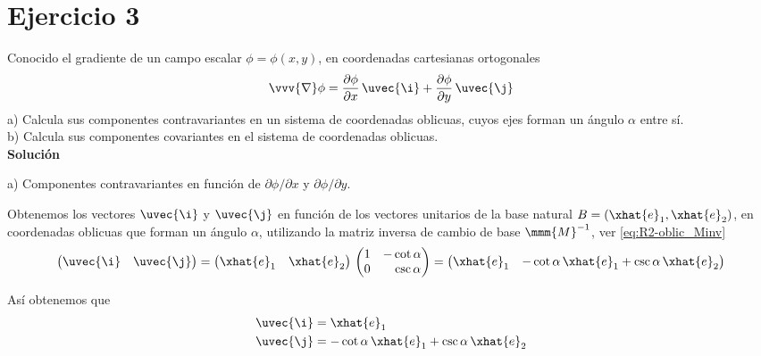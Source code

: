 %

\section{Ejercicio 3}
Conocido el gradiente de un campo escalar $\phi=\phi(x,y)$, en coordenadas cartesianas ortogonales
\[
  \vvv{\nabla}\phi
  = \dfrac{\partial\phi}{\partial x}\,\uvec{\i}
  + \dfrac{\partial\phi}{\partial y}\,\uvec{\j}
\]
\noindent
a) Calcula sus componentes contravariantes en un sistema de coordenadas oblicuas, cuyos
ejes forman un ángulo $\alpha$ entre sí.\\
b) Calcula sus componentes covariantes en el sistema de coordenadas oblicuas.\\

\noindent
\textbf{Solución}

\noindent
a) Componentes contravariantes en función de $\partial\phi/\partial x$ y
$\partial\phi/\partial y$.

Obtenemos los vectores $\uvec{\i}$ y $\uvec{\j}$ en función de los vectores
unitarios de la base natural $B=(\xhat{e}_1, \xhat{e}_2)$, en coordenadas oblicuas que
forman un ángulo $\alpha$, utilizando la matriz inversa de cambio de base
$\mmm{M}^{-1}$, ver \eqref{eq:R2-oblic_Minv}
\[
  \begin{pmatrix}
    \uvec{\i} & \uvec{\j}
  \end{pmatrix}
  =
  \begin{pmatrix}
    \xhat{e}_1 & \xhat{e}_2
  \end{pmatrix}
  \,
  \begin{pmatrix}
    1 & -\cot\alpha\\
    0 & \phantom{-}\csc\alpha
  \end{pmatrix}
  =
  \begin{pmatrix}
    \xhat{e}_1 & -\cot\alpha\,\xhat{e}_1 + \csc\alpha\,\xhat{e}_2
  \end{pmatrix}
\]

Así obtenemos que
\begin{align*}
  \uvec{\i} &= \xhat{e}_1\\
  \uvec{\j} &= -\cot\alpha\,\xhat{e}_1 + \csc\alpha\,\xhat{e}_2
\end{align*}

